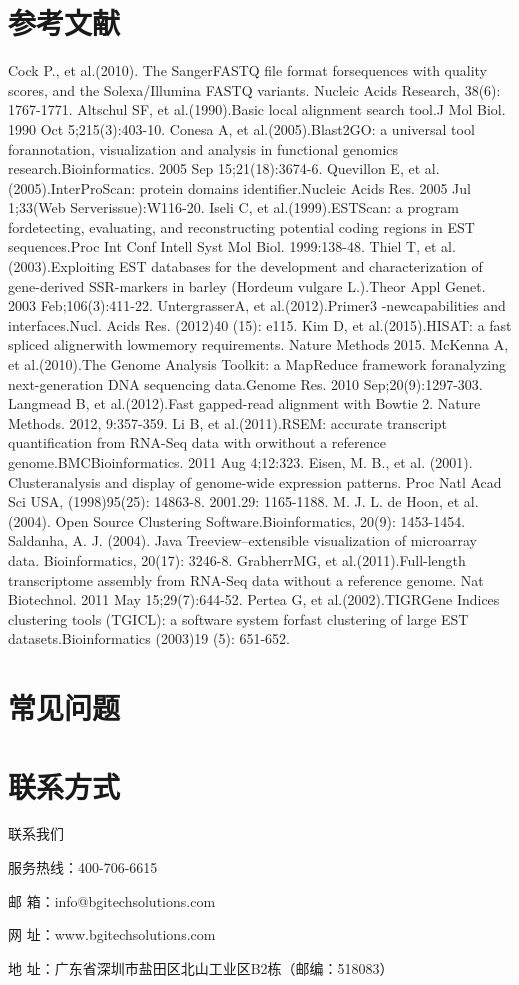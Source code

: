 \documentclass[10pt, oneside,a4paper]{article}
\begin{document}
\section{参考文献}
\renewcommand\refname{ }
\begin{thebibliography}{20}
Cock P., et al.(2010). The SangerFASTQ file format forsequences with quality scores, and the Solexa/Illumina FASTQ variants. Nucleic Acids Research, 38(6): 1767-1771.
Altschul SF, et al.(1990).Basic local alignment search tool.J Mol Biol. 1990 Oct 5;215(3):403-10.
Conesa A, et al.(2005).Blast2GO: a universal tool forannotation, visualization and analysis in functional genomics research.Bioinformatics. 2005 Sep 15;21(18):3674-6.
Quevillon E, et al.(2005).InterProScan: protein domains identifier.Nucleic Acids Res. 2005 Jul 1;33(Web Serverissue):W116-20.
Iseli C, et al.(1999).ESTScan: a program fordetecting, evaluating, and reconstructing potential coding regions in EST sequences.Proc Int Conf Intell Syst Mol Biol. 1999:138-48.
Thiel T, et al.(2003).Exploiting EST databases for the development and characterization of gene-derived SSR-markers in barley (Hordeum vulgare L.).Theor Appl Genet. 2003
Feb;106(3):411-22.
UntergrasserA, et al.(2012).Primer3 -newcapabilities and interfaces.Nucl. Acids Res. (2012)40 (15): e115.
Kim D, et al.(2015).HISAT: a fast spliced alignerwith lowmemory requirements. Nature Methods 2015.
McKenna A, et al.(2010).The Genome Analysis Toolkit: a MapReduce framework foranalyzing next-generation DNA sequencing data.Genome Res. 2010 Sep;20(9):1297-303.
Langmead B, et al.(2012).Fast gapped-read alignment with Bowtie 2. Nature Methods. 2012, 9:357-359.
Li B, et al.(2011).RSEM: accurate transcript quantification from RNA-Seq data with orwithout a reference genome.BMCBioinformatics. 2011 Aug 4;12:323.
Eisen, M. B., et al. (2001). Clusteranalysis and display of genome-wide expression patterns. Proc Natl Acad Sci USA, (1998)95(25): 14863-8. 2001.29: 1165-1188.
M. J. L. de Hoon, et al. (2004). Open Source Clustering Software.Bioinformatics, 20(9): 1453-1454.
Saldanha, A. J. (2004). Java Treeview--extensible visualization of microarray data. Bioinformatics, 20(17): 3246-8.
GrabherrMG, et al.(2011).Full-length transcriptome assembly from RNA-Seq data without a reference genome. Nat Biotechnol. 2011 May 15;29(7):644-52.
Pertea G, et al.(2002).TIGRGene Indices clustering tools (TGICL): a software system forfast clustering of large EST datasets.Bioinformatics (2003)19 (5): 651-652.
\end{thebibliography}
\newpage
\section{常见问题}
\newpage
\section{联系方式}
联系我们\par
服务热线：400-706-6615\par
邮  箱：info@bgitechsolutions.com\par
网  址：www.bgitechsolutions.com\par
地  址：广东省深圳市盐田区北山工业区B2栋（邮编：518083）\par
\end{document}
